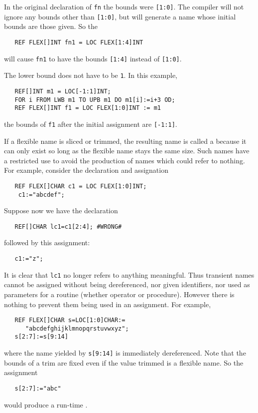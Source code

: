 In the original declaration of \verb|fn| the bounds were \verb|[1:0]|. The
compiler will not ignore any bounds other than \verb|[1:0]|, but will
generate a name whose initial bounds are those given. So the
\begin{verbatim}
   REF FLEX[]INT fn1 = LOC FLEX[1:4]INT
\end{verbatim}
\noindent
will cause \verb|fn1| to have the bounds \verb|[1:4]| instead of
\verb|[1:0]|.

The lower bound does not have to be \verb|1|. In this example,
\begin{verbatim}
   REF[]INT m1 = LOC[-1:1]INT;
   FOR i FROM LWB m1 TO UPB m1 DO m1[i]:=i+3 OD;
   REF FLEX[]INT f1 = LOC FLEX[1:0]INT := m1
\end{verbatim}
\noindent
the bounds of \verb|f1| after the initial assignment are \verb|[-1:1]|.

If a flexible name is sliced or trimmed, the resulting name is called
a  because it can only exist so long as the
flexible name stays the same size. Such names have a restricted use
to avoid the production of names which could refer to nothing. For
example, consider the declaration and assignation
\begin{verbatim}
   REF FLEX[]CHAR c1 = LOC FLEX[1:0]INT;
    c1:="abcdef";
\end{verbatim}
\noindent
Suppose now we have the declaration
\begin{verbatim}
   REF[]CHAR lc1=c1[2:4]; #WRONG#
\end{verbatim}
\noindent
followed by this assignment:
\begin{verbatim}
   c1:="z";
\end{verbatim}
\noindent
It is clear that \verb|lc1| no longer refers to anything meaningful.
Thus transient names cannot be assigned without being dereferenced,
nor given identifiers, nor used as parameters for a routine (whether
operator or procedure).  However there is nothing to prevent them
being used in an assignment.  For example,
\begin{verbatim}
   REF FLEX[]CHAR s=LOC[1:0]CHAR:=
      "abcdefghijklmnopqrstuvwxyz";
   s[2:7]:=s[9:14]
\end{verbatim}
\noindent
where the name yielded by \verb|s[9:14]| is immediately dereferenced.
Note that the bounds of a trim are fixed even if the value trimmed is a
flexible name. So the assignment
\begin{verbatim}
   s[2:7]:="abc"
\end{verbatim}
\noindent
would produce a run-time .

